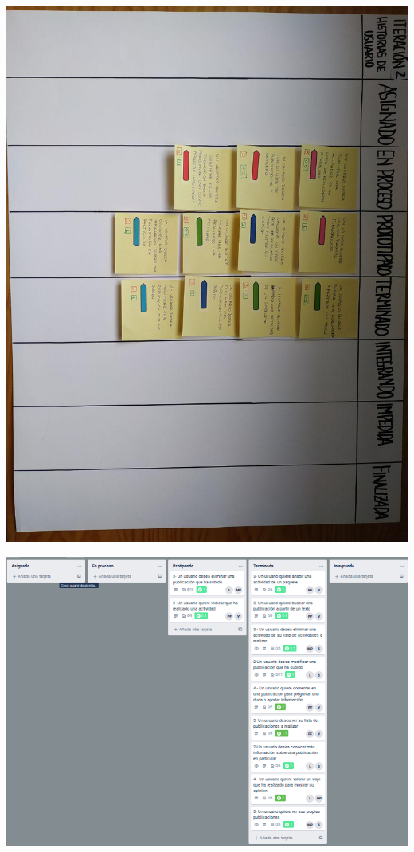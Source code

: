 \documentclass[spanish]{beamer}
\begin{document}
\begin{frame}
	\begin{center}
		\includegraphics[angle=90, scale=0.34]{papel2_5}
	\end{center}
\end{frame}

\begin{frame}
	\begin{center}
		\includegraphics[scale=0.5]{trello2_7}
	\end{center}
\end{frame}
\end{document}
